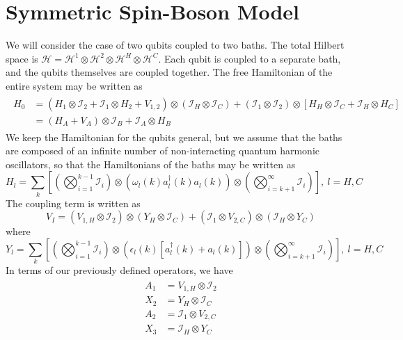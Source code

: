 \documentclass{article}
\newcommand{\ten}{\otimes}
\newcommand{\I}{\mathcal{I}}
\begin{document}
\section{Symmetric Spin-Boson Model}

We will consider the case of two qubits coupled to two baths. The total Hilbert space is $\mathcal{H} = \mathcal{H}^1\ten\mathcal{H}^2\ten\mathcal{H}^H\ten\mathcal{H}^C$. Each qubit is coupled to a separate bath, and the qubits themselves are coupled together. The free Hamiltonian of the entire system may be written as
\begin{align}\label{freeham}
\begin{split}
H_0 &= (H_1\ten \I_2 + \I_1\ten H_2 + V_{1,2})\ten(\I_H\ten \I_C) + (\I_1\ten \I_2)\ten\left[H_H\ten \I_C + \I_H\ten H_C\right]\\
&= (H_A+V_A)\ten \I_B + \I_A\ten H_B
\end{split}
\end{align}
We keep the Hamiltonian for the qubits general, but we assume that the baths are composed of an infinite number of non-interacting quantum harmonic oscillators, so that the Hamiltonians of the baths may be written as
\begin{equation}\label{bathham}
H_l = \sum_k\left[\left(\bigotimes_{i=1}^{k-1}\I_i\right)\ten\left(\omega_l(k) a_l^{\dag}(k)a_l(k)\right)\ten\left(\bigotimes_{i=k+1}^{\infty}\I_i\right)\right],\ l = H,C
\end{equation}
The coupling term is written as
\begin{equation}\label{modcoup}
V_I = \left(V_{1,H}\ten \I_2\right)\ten\left(Y_H\ten \I_C\right) + \left(\I_1\ten V_{2,C}\right)\ten\left(\I_H\ten Y_C\right)
\end{equation}
where
\begin{equation}\label{yl}
Y_l = \sum_k\left[\left(\bigotimes_{i=1}^{k-1}\I_i\right)\ten\left(\epsilon_l(k)\left[a_l^{\dag}(k) + a_l(k)\right]\right)\ten\left(\bigotimes_{i=k+1}^{\infty}\I_i\right)\right],\ l = H,C
\end{equation}
In terms of our previously defined operators, we have
\begin{align}\label{AXop}
\begin{split}
	A_1 &= V_{1,H}\ten \I_2\\
	X_2 &= Y_H\ten \I_C\\ 
	A_2 &= \I_1\ten V_{2,C}\\
	X_3 &= \I_H\ten Y_C
\end{split} 
\end{align}
\end{document}
